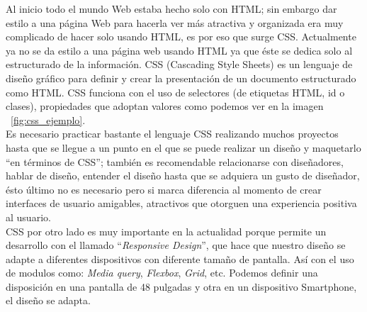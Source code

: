 \documentclass[twocolumns,a4paper]{IEEEtran}
\begin{document}
Al inicio todo el mundo Web estaba hecho solo con HTML; sin embargo dar estilo
a una página Web para hacerla ver más atractiva y organizada era muy complicado
de hacer solo usando HTML, es por eso que surge CSS. Actualmente ya no se da
estilo a una página web usando HTML ya que éste se dedica solo al estructurado
de la información.
CSS (Cascading Style Sheets) es un lenguaje de diseño gráfico para definir y
crear la presentación de un documento estructurado como HTML. CSS funciona con
el uso de selectores (de etiquetas HTML, id o clases), propiedades que adoptan
valores como podemos ver en la imagen ~\ref{fig:css_ejemplo}.\\
Es necesario practicar bastante el lenguaje CSS realizando muchos proyectos
hasta que se llegue a un punto en el que se puede realizar un diseño y
maquetarlo ``en términos de CSS''; también es recomendable relacionarse con
diseñadores, hablar de diseño, entender el diseño hasta que se adquiera un
gusto de diseñador, ésto último no es necesario pero si marca diferencia al
momento de crear interfaces de usuario amigables, atractivos que otorguen una
experiencia positiva al usuario.\\
CSS por otro lado es muy importante en la actualidad porque permite un
desarrollo con el llamado ``\textit{Responsive Design}'', que hace que nuestro
diseño se adapte a diferentes dispositivos con diferente tamaño de pantalla.
Así con el uso de modulos como: \textit{Media query}, \textit{Flexbox},
\textit{Grid}, etc. Podemos definir una disposición en una pantalla de 48
pulgadas y otra en un dispositivo Smartphone, el diseño se adapta.\\
\end{document}
